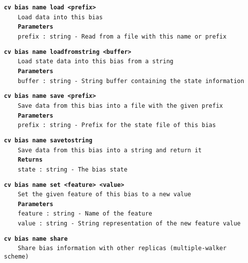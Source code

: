 \begin{mdexampleinput}{}
\texttt{\textbf{cv bias name load <prefix>}}
\\
\-~~~~\texttt{Load data into this bias}
\\
\-~~~~\texttt{\textbf{Parameters}}
\\
\-~~~~\texttt{prefix : string - Read from a file with this name or prefix}
\end{mdexampleinput}
\begin{mdexampleinput}{}
\texttt{\textbf{cv bias name loadfromstring <buffer>}}
\\
\-~~~~\texttt{Load state data into this bias from a string}
\\
\-~~~~\texttt{\textbf{Parameters}}
\\
\-~~~~\texttt{buffer : string - String buffer containing the state information}
\end{mdexampleinput}
\begin{mdexampleinput}{}
\texttt{\textbf{cv bias name save <prefix>}}
\\
\-~~~~\texttt{Save data from this bias into a file with the given prefix}
\\
\-~~~~\texttt{\textbf{Parameters}}
\\
\-~~~~\texttt{prefix : string - Prefix for the state file of this bias}
\end{mdexampleinput}
\begin{mdexampleinput}{}
\texttt{\textbf{cv bias name savetostring}}
\\
\-~~~~\texttt{Save data from this bias into a string and return it}
\\
\-~~~~\texttt{\textbf{Returns}}
\\
\-~~~~\texttt{state : string - The bias state}
\end{mdexampleinput}
\begin{mdexampleinput}{}
\texttt{\textbf{cv bias name set <feature> <value>}}
\\
\-~~~~\texttt{Set the given feature of this bias to a new value}
\\
\-~~~~\texttt{\textbf{Parameters}}
\\
\-~~~~\texttt{feature : string - Name of the feature}
\\
\-~~~~\texttt{value : string - String representation of the new feature value}
\end{mdexampleinput}
\begin{mdexampleinput}{}
\texttt{\textbf{cv bias name share}}
\\
\-~~~~\texttt{Share bias information with other replicas (multiple-walker scheme)}
\end{mdexampleinput}
